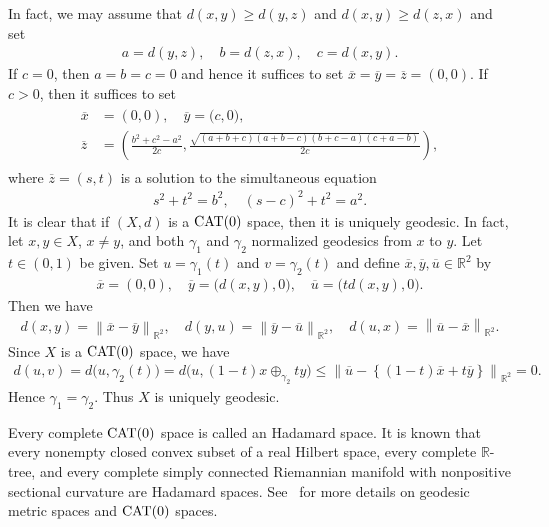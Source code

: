 \documentclass[draft]{amsart}
\numberwithin{equation}{section}
\def\R{\mathbb R}
\providecommand{\norm}[1]{\left\lVert#1\right\rVert}
\newcommand{\CAT}{\textup{CAT}}
\theoremstyle{plain}
\theoremstyle{definition}
\theoremstyle{remark}
\begin{document}
In fact, we may assume that $d(x,y)\geq d(y, z)$ and 
$d(x,y)\geq d(z,x)$ and set 
\begin{align}
 a=d(y,z), \quad b=d(z,x), \quad c=d(x,y). 
\end{align}
If $c=0$, then $a=b=c=0$ and hence it suffices to set 
$\overline{x}=\overline{y}=\overline{z}=(0,0)$. 
If $c>0$, then it suffices to 
set 
\begin{align}
 \begin{split}
 \overline{x}&=(0,0), \quad 
 \overline{y}=\bigl(c,0\bigr), \\
 \overline{z}&= 
 \left(\frac{b^2+c^2-a^2}{2c}, 
 \frac{\sqrt{(a+b+c)(a+b-c)(b+c-a)(c+a-b)}}{2c}
 \right),   
 \end{split}
\end{align}
where $\overline{z}=(s,t)$ is a solution to the simultaneous equation 
\begin{align}
 s^2+t^2=b^2, \quad (s-c)^2 + t^2 = a^2. 
\end{align}
It is clear that if $(X,d)$ is a $\CAT(0)$ space, then 
it is uniquely geodesic. 
In fact, let $x,y\in X$, $x\neq y$, 
and both $\gamma_1$ and $\gamma_2$  
normalized geodesics from $x$ to $y$. Let $t\in (0,1)$ be given. 
Set $u=\gamma _1(t)$ and $v=\gamma_2(t)$ and 
define $\overline{x}, \overline{y}, \overline{u}\in \R^2$ 
by 
\begin{align}
 \overline{x}=(0,0), \quad 
 \overline{y}=\bigl(d(x,y),0\bigr), \quad 
 \overline{u}=\bigl(td(x,y),0\bigr). 
\end{align}
Then we have
\begin{align}
 d(x, y)=\norm{\overline{x}-\overline{y}}_{\R^2}, \quad  
 d(y, u)= \norm{\overline{y}-\overline{u}}_{\R^2}, \quad  
 d(u, x)= \norm{\overline{u}-\overline{x}}_{\R^2}. 
\end{align} 
Since $X$ is a $\CAT(0)$ space, we have 
\begin{align}
 d(u,v)=d\bigl(u, \gamma_2(t)\bigr)
 =d\bigl(u, \left(1-t\right)x\oplus_{\gamma_2}ty\bigr) 
 \leq \norm{\overline{u}- \left\{
\left(1-t\right)\overline{x}+t\overline{y}
\right\}
}_{\R^2} 
=0. 
\end{align}
Hence $\gamma_1=\gamma_2$. Thus $X$ is uniquely geodesic.  
\fi

Every complete $\CAT(0)$ space is called an Hadamard space. 
It is known that every nonempty closed convex subset of a real Hilbert space, 
every complete $\R$-tree, 
and every complete simply connected Riemannian manifold 
with nonpositive sectional curvature are 
Hadamard spaces. 
See~\cites{MR3241330, MR1744486, MR1835418} for more details 
on geodesic metric spaces and $\CAT(0)$ spaces. 
\end{document}
